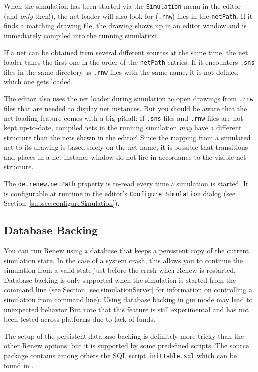 When the simulation has been started via the \texttt{Simulation} menu in
the editor (and \emph{only} then!), the net loader will also look for
(\texttt{.rnw}) files in the \texttt{netPath}.
If it finds a matching drawing file, the drawing shows up in an editor
window and is immediately compiled into the running simulation.

If a net can be obtained from several different sources at the same time,
the net loader takes the first one in the order of the \texttt{netPath}
entries.
If it encounters \texttt{.sns} files in the same directory as
\texttt{.rnw} files with the same name, it is not defined which one gets
loaded.

The editor also uses the net loader during simulation to open drawings
from \texttt{.rnw} files that are needed to display net instances.
But you should be aware that the net loading feature comes with a big
pitfall:
If \texttt{.sns} files and \texttt{.rnw} files are not kept up-to-date,
compiled nets in the running simulation \emph{may} have a different
structure than the nets shown in the editor!
Since the mapping from a simulated net to its drawing is based solely on
the net name, it is possible that transitions and places in a net instance
window do not fire in accordance to the visible net structure.

The \texttt{de.renew.netPath} property is re-read every
time a simulation is started.
It is configurable at runtime in the editor's \texttt{Configure
Simulation} dialog (see Section~\ref{subsec:configureSimulation}).

\subsection{Database Backing}

You can run Renew using a database that keeps a persistent
copy of the current simulation state. 
In the case of a system crash, this allows 
you to continue the simulation from a valid state just before 
the crash when Renew is restarted.
Database backing is only supported when the simulation
is started from the command line (see Section~\ref{sec:simulationServer} for information on controlling a simulation from command line).
Using database backing in gui mode may lead to unexpected behavior
But note that this feature is
still experimental and has not been tested across platforms
due to lack of funds.

The setup of the persistent database backing
is definitely more tricky than the
other Renew options, but it is supported by some predefined 
scripts. The source package contains among others the
SQL script \texttt{initTable.sql} which can be found in
.

